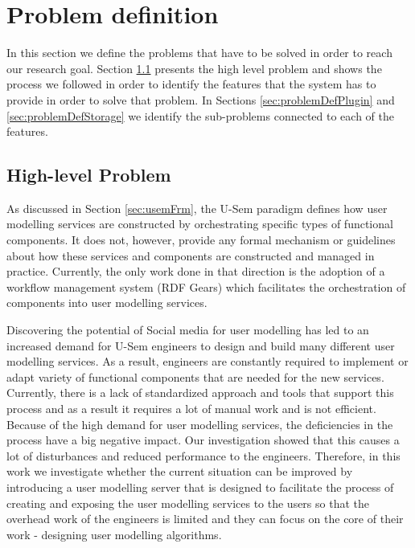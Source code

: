 
\chapter{Problem definition}
\label{cha:problemDef}

In this section we define the problems that have to be solved in order to reach our research goal. Section \ref{sec:mainProblem} presents the high level problem and shows the process we followed in order to identify the features that the system has to provide in order to solve that problem. In Sections \ref{sec:problemDefPlugin} and \ref{sec:problemDefStorage} we identify the sub-problems connected to each of the features. 

\section{High-level Problem}
\label{sec:mainProblem}

As discussed in Section \ref{sec:usemFrm}, the U-Sem paradigm defines how user modelling services are constructed by orchestrating specific types of functional components. It does not, however, provide any formal mechanism or guidelines about how these services and components are constructed and managed in practice. Currently, the only work done in that direction is the adoption of a workflow management system (RDF Gears) which facilitates the orchestration of components into user modelling services. 

Discovering the potential of Social media for user modelling \cite{brusilovsky2007adaptive} has led to an increased demand for U-Sem engineers to design and build many different user modelling services. As a result, engineers are constantly required to implement or adapt variety of functional components that are needed for the new services. Currently, there is a lack of standardized approach and tools that support this process and as a result it requires a lot of manual work and is not efficient. Because of the high demand for user modelling services, the deficiencies in the process have a big negative impact. Our investigation showed that this causes a lot of disturbances and reduced performance to the engineers. Therefore, in this work we investigate whether the current situation can be improved by introducing a user modelling server that is designed to facilitate the process of creating and exposing the user modelling services to the users so that the overhead work of the engineers is limited and they can focus on the core of their work - designing user modelling algorithms.

